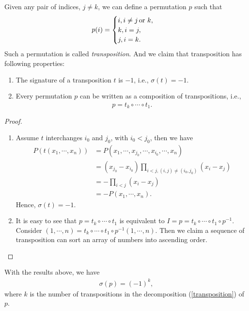 \documentclass[10pt]{book}
\theoremstyle{definition}
\numberwithin{equation}{chapter}
\begin{document}
Given any pair of indices, $j\neq k$, we can define a permutation $p$ such that
\begin{align*}
    p(i) = \begin{cases}
    i, i\neq j\, {\rm or}\,\, k, \\
    k, i = j, \\
    j, i = k.
    \end{cases}
\end{align*}
Such a permutation is called \emph{transposition}. And we claim that transposition has following properties:
\begin{enumerate}[label=(\alph*)]
    \item The signature of a transposition $t$ is $-1$, i.e., $\sigma(t) = -1$.
    \item Every permutation $p$ can be written as a composition of transpositions, i.e., 
    \begin{align}\label{transposition}
        p = t_k\circ \cdots \circ t_1.
    \end{align}
\end{enumerate}
\begin{proof}
~\begin{enumerate}[label=(\alph*)]
    \item Assume $t$ interchanges $i_0$ and $j_0$, with $i_0<j_0$, then we have
    \begin{align*}
        P\left(t(x_1,\cdots,x_n)\right) & = P(x_1,\cdots,x_{j_0},\cdots,x_{i_0},\cdots,x_n) \\
        & = (x_{j_0} - x_{i_0})\prod_{i<j,(i,j)\neq(i_0,j_0)} (x_i - x_j) \\
        & = - \prod_{i<j}(x_i - x_j) \\
        & = - P(x_1,\cdots,x_n).
    \end{align*}
    Hence, $\sigma(t) = -1$.
    \item It is easy to see that $p = t_k\circ \cdots \circ t_1$ is equivalent to $I = p = t_k\circ \cdots \circ t_1 \circ p^{-1}$. Consider $(1,\cdots, n) = t_k\circ \cdots \circ t_1 \circ p^{-1}(1,\cdots,n)$. Then we claim a sequence of transposition can sort an array of numbers into ascending order.
\end{enumerate}
\end{proof}

With the results above, we have
\begin{align*}
    \sigma(p) = (-1)^{k},
\end{align*}
where $k$ is the number of transpositions in the decomposition (\ref{transposition}) of $p$.
\end{document}

